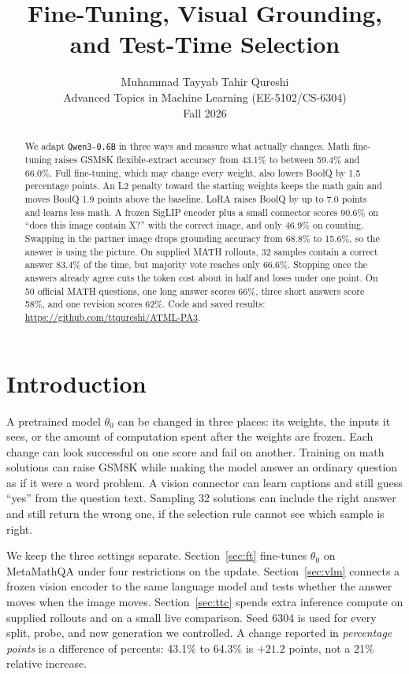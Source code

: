 \documentclass[10pt]{article}
\title{Fine-Tuning, Visual Grounding, and Test-Time Selection}
\author{Muhammad Tayyab Tahir Qureshi\\
Advanced Topics in Machine Learning (EE-5102/CS-6304)\\
Fall 2026}
\begin{document}
\maketitle

\begin{abstract}
We adapt \texttt{Qwen3-0.6B} in three ways and measure what actually changes.
Math fine-tuning raises GSM8K flexible-extract accuracy from 43.1\% to between 59.4\% and 66.0\%.
Full fine-tuning, which may change every weight, also lowers BoolQ by 1.5 percentage points.
An L2 penalty toward the starting weights keeps the math gain and moves BoolQ 1.9 points above the baseline.
LoRA raises BoolQ by up to 7.0 points and learns less math.
A frozen SigLIP encoder plus a small connector scores 90.6\% on ``does this image contain X?'' with the correct image, and only 46.9\% on counting.
Swapping in the partner image drops grounding accuracy from 68.8\% to 15.6\%, so the answer is using the picture.
On supplied MATH rollouts, 32 samples contain a correct answer 83.4\% of the time, but majority vote reaches only 66.6\%.
Stopping once the answers already agree cuts the token cost about in half and loses under one point.
On 50 official MATH questions, one long answer scores 66\%, three short answers score 58\%, and one revision scores 62\%.
Code and saved results: \url{https://github.com/ttqureshi/ATML-PA3}.
\end{abstract}

\section{Introduction}
A pretrained model $\theta_0$ can be changed in three places: its weights, the inputs it sees, or the amount of computation spent after the weights are frozen.
Each change can look successful on one score and fail on another.
Training on math solutions can raise GSM8K while making the model answer an ordinary question as if it were a word problem.
A vision connector can learn captions and still guess ``yes'' from the question text.
Sampling 32 solutions can include the right answer and still return the wrong one, if the selection rule cannot see which sample is right.

We keep the three settings separate.
Section~\ref{sec:ft} fine-tunes $\theta_0$ on MetaMathQA under four restrictions on the update.
Section~\ref{sec:vlm} connects a frozen vision encoder to the same language model and tests whether the answer moves when the image moves.
Section~\ref{sec:ttc} spends extra inference compute on supplied rollouts and on a small live comparison.
Seed 6304 is used for every split, probe, and new generation we controlled.
A change reported in \emph{percentage points} is a difference of percents: 43.1\% to 64.3\% is $+21.2$ points, not a 21\% relative increase.
\end{document}
